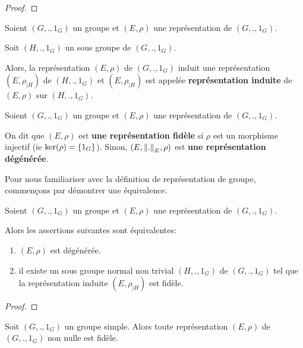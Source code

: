 \ifdefined\outputproof
\begin{proof}

\end{proof}
\fi

\begin{definition} 
	Soient $(G, ., 1_{G})$ un groupe et $(E, \rho)$ une représentation de $(G, ., 1_{G})$.

	Soit $(H, ., 1_{G})$ un sous groupe de $(G, ., 1_{G})$.

	Alors, la représentation $(E, \rho)$ de $(G, ., 1_{G})$ induit
	une représentation $(E,
	\rho_{|H})$ de $(H, ., 1_{G})$ et $(E, \rho_{|H})$ est appelée
	\textbf{représentation induite} de $(E, \rho)$ sur $(H,
	., 1_{G})$.
\end{definition}

\begin{definition} 
	Soient $(G, ., 1_{G})$ un groupe et $(E, \rho)$ une représentation de $(G, ., 1_{G})$.

	On dit que $(E, \rho)$ est \textbf{une représentation fidèle} si $\rho$ est
	un morphisme injectif (ie $\ker(\rho) = \left\{ 1_{G} \right\}$). Sinon, $(E,
	\norm{.}_{E}, \rho)$
	est \textbf{une représentation dégénérée}.
\end{definition}

Pour nous familiariser avec la définition de représentation de groupe,
commençons par démontrer une équivalence.

\begin{proposition}
	Soient $(G, ., 1_{G})$ un groupe et $(E, \rho)$ une représentation de $(G, ., 1_{G})$.

	Alors les assertions suivantes sont équivalentes:
	\begin{enumerate}
		\item $(E, \rho)$ est dégénérée.
		\item il existe un sous groupe normal non trivial $(H, ., 1_{G})$ de $(G, ., 1_{G})$
			tel que la représentation induite $(E, \rho_{|H})$ est fidèle.
	\end{enumerate}
\end{proposition}

\ifdefined\outputproof
\begin{proof}

\end{proof}
\fi

\begin{corollary}
	Soit $(G, ., 1_{G})$ un groupe simple. Alors toute représentation $(E,
	\rho)$ de
	$(G, ., 1_{G})$ non nulle est fidèle.
\end{corollary}

